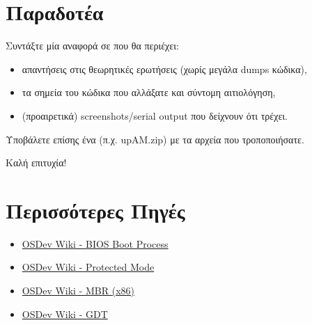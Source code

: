 \documentclass[18pt]{extarticle}
\begin{document}

\section{Παραδοτέα}

Συντάξτε μία αναφορά σε  που θα περιέχει:
\begin{itemize}
    \item απαντήσεις στις θεωρητικές ερωτήσεις (χωρίς μεγάλα dumps κώδικα),
    \item τα σημεία του κώδικα που αλλάξατε και σύντομη αιτιολόγηση,
    \item (προαιρετικά) screenshots/serial output που δείχνουν ότι τρέχει.
\end{itemize}

Υποβάλετε επίσης ένα  (π.χ. upAM.zip) με τα αρχεία που τροποποιήσατε.

Καλή επιτυχία!

\section*{Περισσότερες Πηγές}

\begin{itemize}
    \item \href{https://wiki.osdev.org/Boot_Sequence}{OSDev Wiki - BIOS Boot Process}
    \item \href{https://wiki.osdev.org/Protected_mode}{OSDev Wiki - Protected Mode}
    \item \href{https://wiki.osdev.org/MBR_(x86)}{OSDev Wiki - MBR (x86)}
    \item \href{https://wiki.osdev.org/GDT}{OSDev Wiki - GDT}
\end{itemize}
\end{document}
